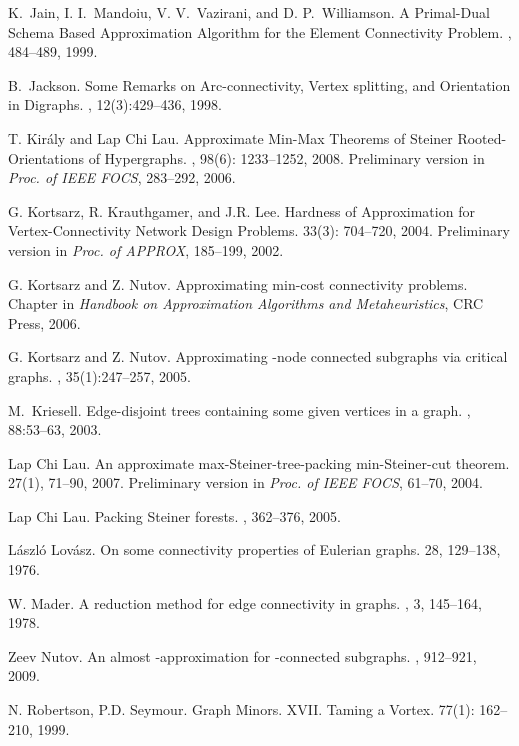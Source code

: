 \documentclass[11pt]{article}
\begin{document}
\begin{thebibliography}{55}
K.~Jain, I. I.~Mandoiu, V. V.~Vazirani, and D. P.~Williamson.
\newblock A Primal-Dual Schema Based Approximation Algorithm for the
Element Connectivity Problem. 
, 484--489, 1999.

B.~Jackson.
\newblock Some Remarks on Arc-connectivity, Vertex splitting, and
Orientation in Digraphs.
, 12(3):429--436, 1998.

T. Kir\'{a}ly and Lap Chi Lau.
\newblock Approximate Min-Max Theorems of Steiner Rooted-Orientations of Hypergraphs.
, 98(6): 1233--1252, 2008.
\newblock Preliminary version in {\em Proc. of IEEE FOCS}, 283--292, 2006.
 
G. Kortsarz, R. Krauthgamer, and J.R. Lee.
\newblock Hardness of Approximation for Vertex-Connectivity Network
Design Problems.
 33(3): 704--720, 2004.
\newblock Preliminary version in {\em Proc. of APPROX}, 185--199, 2002.

G. Kortsarz and Z. Nutov.
\newblock Approximating min-cost connectivity problems.
\newblock Chapter in {\em Handbook on Approximation Algorithms and Metaheuristics}, CRC Press, 
2006.

G. Kortsarz and Z. Nutov.
\newblock Approximating -node connected subgraphs via critical graphs.
, 35(1):247--257, 2005.

M.~Kriesell.
\newblock Edge-disjoint trees containing some given vertices in a
graph.
, 88:53--63, 2003.

Lap Chi Lau.
\newblock An approximate max-Steiner-tree-packing min-Steiner-cut
theorem.
 27(1), 71--90, 2007.
\newblock Preliminary version in {\em Proc. of IEEE FOCS}, 61--70, 2004.

Lap Chi Lau.
\newblock Packing Steiner forests.
, 362--376, 2005.

L\'{a}szl\'{o} Lov\'{a}sz.
\newblock On some connectivity properties of Eulerian graphs.
 28, 129--138, 1976.

W. Mader.
\newblock A reduction method for edge connectivity in graphs.
, 3, 145--164, 1978.

Zeev Nutov.
\newblock An almost -approximation for -connected
subgraphs. 
, 912--921, 2009.

N. Robertson, P.D. Seymour.
\newblock Graph Minors. XVII. Taming a Vortex.
 77(1): 162--210, 1999.

\end{thebibliography}
\end{document}
